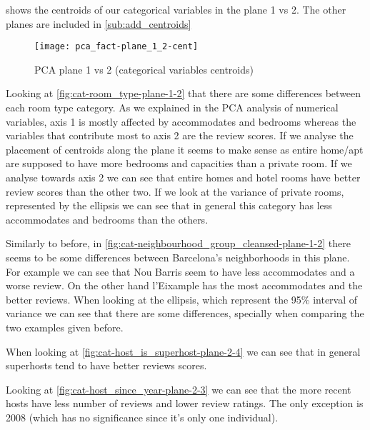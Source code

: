 \begin{landscape}

 shows the centroids of our categorical variables in the plane 1 vs 2. The other planes are included
in \ref{sub:add_centroids}

\begin{figure}[H]
    \centering
    \texttt{[image: pca\_fact-plane\_1\_2-cent]}
    \caption{PCA plane 1 vs 2 (categorical variables centroids)}%
    \label{fig:plane_1-2-cent-}
\end{figure}


Looking at \cref{fig:cat-room_type-plane-1-2} that there are some 
differences between each room type category. As we explained in the PCA analysis of numerical variables, axis 1 is mostly affected by accommodates and bedrooms whereas the variables that contribute most to axis 2 are the review scores. If we analyse the
placement of centroids along the plane it seems to make sense as entire home/apt are supposed to have more bedrooms and capacities than a private room. If we analyse towards axis 2 we can see that entire homes and hotel rooms have better review scores than the 
other two. If we look at the variance of private rooms, represented by the ellipsis we 
can see that in general this category has less accommodates and bedrooms than the others.



Similarly to before, in \cref{fig:cat-neighbourhood_group_cleansed-plane-1-2} there seems to be some differences between Barcelona's neighborhoods in this plane. For example we can 
see that Nou Barris seem to have less accommodates and a worse review. On the other
hand l'Eixample has the most accommodates and the better reviews. When looking at
the ellipsis, which represent the 95\% interval of variance we can see that there are
some differences, specially when comparing the two examples given before. 

When looking at \cref{fig:cat-host_is_superhost-plane-2-4} we can
see that in general superhosts tend to have better reviews scores.

Looking at \cref{fig:cat-host_since_year-plane-2-3} we can see that the more recent hosts have less number of
reviews and lower review ratings.
The only exception is 2008 (which has no significance since it's only one individual).

\end{landscape}

